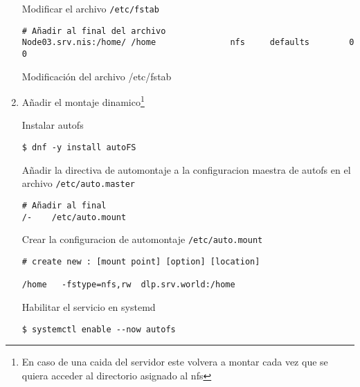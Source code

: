 \documentclass[../main.tex]{subfiles}
\begin{document}
\begin{enumerate}
        Modificar el archivo \texttt{/etc/fstab}
        \begin{listing}[H]
\begin{verbatim}
# Añadir al final del archivo
Node03.srv.nis:/home/ /home               nfs     defaults        0 0
\end{verbatim}
          \label{list:fstab}
          \caption{Modificación del archivo /etc/fstab}
        \end{listing}

  \item Añadir el montaje dinamico\footnote{En caso de una caida
        del servidor este volvera a montar cada vez que se
        quiera acceder al directorio asignado al \Gls{nfs}}

        Instalar \Gls{autofs}

        \begin{listing}[H]
\begin{verbatim}
$ dnf -y install autoFS
\end{verbatim}
        \end{listing}
        Añadir la directiva de automontaje a la configuracion maestra de
        \gls{autofs} en el archivo \texttt{/etc/auto.master}

        \begin{listing}[H]
\begin{verbatim}
# Añadir al final
/-    /etc/auto.mount
\end{verbatim}
        \end{listing}

        Crear la configuracion de automontaje \texttt{/etc/auto.mount}

        \begin{listing}[H]
\begin{verbatim}
# create new : [mount point] [option] [location]

/home   -fstype=nfs,rw  dlp.srv.world:/home
\end{verbatim}
        \end{listing}

        Habilitar el servicio en \gls{systemd}
        \begin{listing}[H]
\begin{verbatim}
$ systemctl enable --now autofs
\end{verbatim}
        \end{listing}

\end{enumerate}
\end{document}
